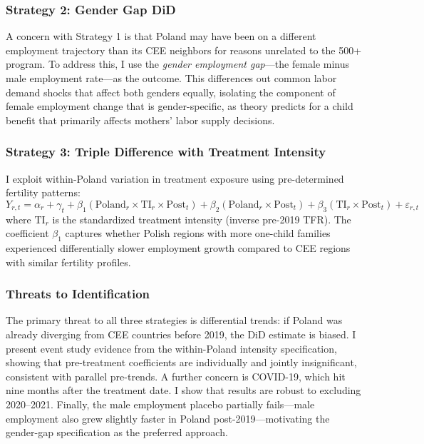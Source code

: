 \documentclass[12pt]{article}
\begin{document}
\subsubsection*{Strategy 2: Gender Gap DiD}  A concern with Strategy 1 is that Poland may have been on a different employment trajectory than its CEE neighbors for reasons unrelated to the 500+ program. To address this, I use the \textit{gender employment gap}---the female minus male employment rate---as the outcome. This differences out common labor demand shocks that affect both genders equally, isolating the component of female employment change that is gender-specific, as theory predicts for a child benefit that primarily affects mothers' labor supply decisions.

\subsubsection*{Strategy 3: Triple Difference with Treatment Intensity}  I exploit within-Poland variation in treatment exposure using pre-determined fertility patterns:
\begin{equation}
Y_{r,t} = \alpha_r + \gamma_t + \beta_1 (\text{Poland}_r \times \text{TI}_r \times \text{Post}_t) + \beta_2 (\text{Poland}_r \times \text{Post}_t) + \beta_3 (\text{TI}_r \times \text{Post}_t) + \varepsilon_{r,t}
\label{eq:triple}
\end{equation}
where $\text{TI}_r$ is the standardized treatment intensity (inverse pre-2019 TFR). The coefficient $\beta_1$ captures whether Polish regions with more one-child families experienced differentially slower employment growth compared to CEE regions with similar fertility profiles.

\subsubsection*{Threats to Identification}  The primary threat to all three strategies is differential trends: if Poland was already diverging from CEE countries before 2019, the DiD estimate is biased. I present event study evidence from the within-Poland intensity specification, showing that pre-treatment coefficients are individually and jointly insignificant, consistent with parallel pre-trends. A further concern is COVID-19, which hit nine months after the treatment date. I show that results are robust to excluding 2020--2021. Finally, the male employment placebo partially fails---male employment also grew slightly faster in Poland post-2019---motivating the gender-gap specification as the preferred approach.
\end{document}
